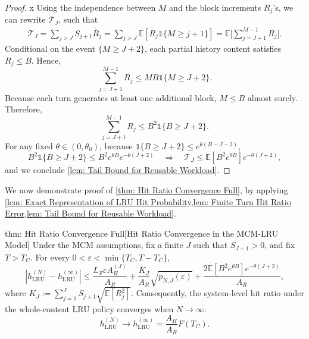\documentclass{article}
\theoremstyle{definition}
\newcommand{\E}{\mathbb E}
\newcommand{\LRU}{\mathrm{LRU}}
\newcommand{\one}{\mathds{1}}
\begin{document}
\begin{proof}x
    Using the independence between $M$ and the block increments $R_j$'s, we can rewrite $\mathcal T_J$, such that
    \begin{align*}
        \mathcal T_J = \sum_{j>J}S_{j+1}\bar R_j =\sum_{j>J}\E\left[R_j\one\{M\geq j+1\}\right] =\E\Big[\sum_{j=J+1}^{M-1}R_j\Big].
    \end{align*}
    Conditional on the event $\{M\geq J+2\}$, each partial history content satisfies $R_j\leq B$. Hence,
    \begin{equation*}
        \sum_{j=J+1}^{M-1}R_j \leq MB\one\{M\geq J+2\}.
    \end{equation*}
    Because each turn generates at least one additional block, $M\leq B$ almost surely. Therefore,
    \begin{equation*}
        \sum_{j=J+1}^{M-1}R_j \leq B^2\one\{B\geq J+2\}.
    \end{equation*}
    For any fixed $\theta\in(0,\theta_0)$, because $\one\{B\geq J+2\} \leq e^{\theta (B-J-2)}$,
    \begin{equation*}
        B^2\one\{B\geq J+2\} \leq B^2e^{\theta B}e^{-\theta(J+2)} \quad \Rightarrow \quad  \mathcal T_J\leq\E[B^2e^{\theta B}]e^{-\theta(J+2)},
    \end{equation*}
    and we conclude \cref{lem: Tail Bound for Reusable Workload}.
\end{proof}

We now demonstrate proof of \cref{thm: Hit Ratio Convergence Full}, by applying \cref{lem: Exact Representation of LRU Hit Probability,lem: Finite Turn Hit Ratio Error,lem: Tail Bound for Reusable Workload}.

\begin{reptheorem}{thm: Hit Ratio Convergence Full}[Hit Ratio Convergence in the MCM-LRU Model]
    Under the MCM assumptions, fix a finite $J$ such that $S_{J+1}>0$, and fix $T>T_C$. For every $0<\varepsilon<\min\{T_C,T-T_C\}$,
    \begin{equation*}
    \left|h_{\LRU}^{(N)} -h_{\LRU}^{(\infty)}  \right| \leq \frac{L_F\varepsilon A_H^{(J)}}{A_R} +\frac{K_J}{A_R}\sqrt{p_{N,J}(\varepsilon)} +\frac{2\E[B^2e^{\theta B}]e^{-\theta(J+2)}}{A_R},
    \end{equation*}
    where $K_J:=\sum_{j=1}^{J}S_{j+1}\sqrt{\E[R_j^2]}$.
    Consequently, the system-level hit ratio under the whole-content LRU policy converges when $N\rightarrow\infty$:
    \begin{equation*}
        h_{\LRU}^{(N)} \rightarrow h_{\LRU}^{(\infty)}  =\frac{A_H}{A_R} F(T_C).
    \end{equation*}
\end{reptheorem}
\end{document}
